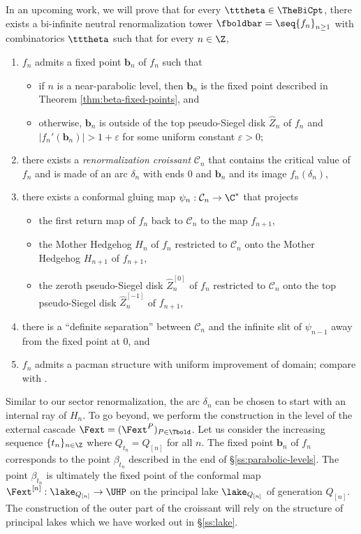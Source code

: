 \documentclass{amsart}
\begin{document}
In an upcoming work, we will prove that for every $\tttheta \in \TheBiCpt$, there exists a bi-infinite neutral renormalization tower $\fboldbar = \seq{f_n}_{n \geq 1}$ with combinatorics $\tttheta$ such that for every $n \in \Z$,
\begin{enumerate}[label = \textnormal{(\alph*)}]
    \item \label{cyl-a} $f_n$ admits a fixed point $\mathbf{b}_n$ of $f_n$ such that
    \begin{itemize}
        \item if $n$ is a near-parabolic level, then $\mathbf{b}_n$ is the fixed point described in Theorem \ref{thm:beta-fixed-points}, and
        \item otherwise, $\mathbf{b}_n$ is outside of the top pseudo-Siegel disk $\hat{Z}_n$ of $f_n$ and $|f_n'(\mathbf{b}_n)|> 1+ \varepsilon$ for some uniform constant $\varepsilon > 0$;
    \end{itemize}
    \item \label{cyl-b} there exists a \emph{renormalization croissant} $\mathcal{C}_n$ that contains the critical value of $f_n$ and is made of an arc $\delta_n$ with ends $0$ and $\mathbf{b}_n$ and its image $f_n(\delta_n)$,
    \item \label{cyl-c} there exists a conformal gluing map $\psi_n : \mathcal{C}_n \to \C^*$ that projects 
    \begin{itemize}
        \item the first return map of $f_n$ back to $\mathcal{C}_n$ to the map $f_{n+1}$,
        \item the Mother Hedgehog $H_n$ of $f_n$ restricted to $\mathcal{C}_n$ onto the Mother Hedgehog $H_{n+1}$ of $f_{n+1}$,
        \item the zeroth pseudo-Siegel disk $\hat{Z}_n^{[0]}$ of $f_n$ restricted to $\mathcal{C}_n$ onto the top pseudo-Siegel disk $\hat{Z}_n^{[-1]}$ of $f_{n+1}$,
    \end{itemize}
    \item \label{cyl-d} there is a ``definite separation'' between $\mathcal{C}_n$ and the infinite slit of $\psi_{n-1}$ away from the fixed point at $0$, and
    \item \label{cyl-e} $f_n$ admits a pacman structure with uniform improvement of domain; compare with \cite{DLS}.
\end{enumerate}

Similar to our sector renormalization, the arc $\delta_n$ can be chosen to start with an internal ray of $H_n$. To go beyond, we perform the construction in the level of the external cascade $\Fext = (\Fext^P)_{P \in \Tbold}$.
Let us consider the increasing sequence $\{t_n\}_{n \in \Z}$ where $Q_{t_n} = Q_{[n]}$ for all $n$.
The fixed point $\mathbf{b}_n$ of $f_n$ corresponds to the point $\beta_{t_n}$ described in the end of \S\ref{ss:parabolic-levels}.
The point $\beta_{t_n}$ is ultimately the fixed point of the conformal map $\Fext^{[n]}: \lake_{Q_{[n]}} \to \UHP$ on the principal lake $\lake_{Q_{[n]}}$ of generation $Q_{[n]}$.
The construction of the outer part of the croissant will rely on the structure of principal lakes which we have worked out in \S\ref{ss:lake}.
\end{document}
